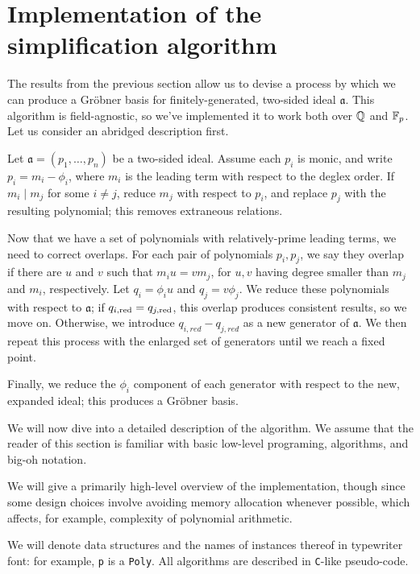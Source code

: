 \section{Implementation of the simplification algorithm}
\label{sec:implementation}

The results from the previous section allow us to devise a process by which we can
produce a Gr\"obner basis for 
finitely-generated, two-sided ideal $\mathfrak{a}$. This
algorithm is field-agnostic, so we've implemented it to work both over $\mathbb{Q}$ and $\mathbb{F}_p$.
Let us consider an abridged description first.

\begin{alg}
    Let $\mathfrak{a} = (p_1,\ldots,p_n)$ be a two-sided ideal. Assume each $p_i$ is
    monic, and write $p_i = m_i - \phi_i$, where $m_i$ is the leading term with respect 
    to the deglex order. If $m_i \mid m_j$ for some $i\neq j$, 
    reduce $m_j$ with respect to $p_i$, and replace $p_j$ with the resulting polynomial; 
    this removes extraneous relations.
    
    Now that we have a set of polynomials with relatively-prime leading terms, we need
    to correct overlaps. For each pair of polynomials $p_i,p_j$, we say they overlap 
    if there are $u$ and $v$ such that $m_i u = v m_j$, for $u, v$ having degree smaller 
    than $m_j$ and $m_i$, respectively. Let $q_i = \phi_i u$ and $q_j = v\phi_j$.
    We reduce these polynomials with respect to $\mathfrak{a}$; if $q_{i,\mathrm{red}} = q_{j,\mathrm{red}}$,
    this overlap produces consistent results, so we move on. Otherwise, we introduce
    $q_{i,red} - q_{j,red}$ as a new generator of $\mathfrak{a}$. 
    We then repeat this process with the enlarged set of generators 
    until we reach a fixed point.
    
    Finally, we reduce the $\phi_i$ component of each generator 
    with respect to the new, expanded ideal; this produces a Gr\"obner basis.
\end{alg}

We will now dive into a detailed description of the algorithm. We assume that the
reader of this section is familiar with basic low-level programing, algorithms, and
big-oh notation.

\begin{rem}
    We will give a primarily high-level overview of the implementation, though since some
    design choices involve avoiding memory allocation whenever possible, which
    affects, for example, complexity of polynomial arithmetic. 
    
    We will denote data structures and the names of instances thereof in typewriter font:
    for example, \verb|p| is a \verb|Poly|. All algorithms are described in
    \verb|C|-like pseudo-code.
\end{rem}

